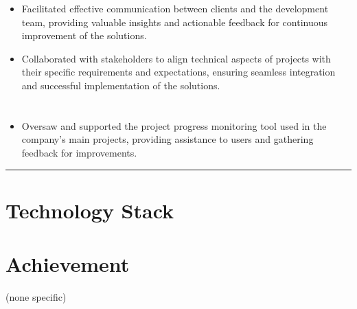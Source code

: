 \documentclass[12pt]{res}
\begin{document}
\begin{resume}
\begin{multicols}{2}
\begin{itemize}
\item Facilitated effective communication between clients and the development team, providing valuable insights and actionable feedback for continuous improvement of the solutions.

\item Collaborated with stakeholders to align technical aspects of projects with their specific requirements and expectations, ensuring seamless integration and successful implementation of the solutions.
		\end{itemize}
	\section{}
		\begin{itemize}
			\setlength{\itemindent}{0pt}
			\item Oversaw and supported the project progress monitoring tool used in the company's main projects, providing assistance to users and gathering feedback for improvements.
		\end{itemize}
\end{multicols}

\vspace{-20pt}
\begin{minipage}[t]{0.55\linewidth}
	\rule{0.25\textwidth}{2pt}
	\begin{multicols}{2}
		\section{Technology Stack}
		\columnbreak
		\section{}
	\end{multicols}
	\vspace{1pt}
\end{minipage}
\hfill
\begin{minipage}[t]{0.42\linewidth}
	\vspace{18pt}
	\section{Achievement}
	\begin{flushleft}
        \begin{itemize}
		\footnotesize{(none specific)}
        \end{itemize}
	\end{flushleft}
\end{minipage}


\end{resume}
\end{document}
